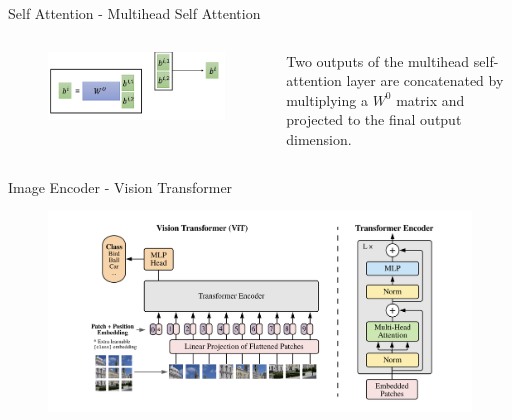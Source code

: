 \documentclass[aspectratio=169,xcolor=dvipsnames]{beamer}
\begin{document}
\begin{frame}{Self Attention - Multihead Self Attention}
    \begin{columns}
        \begin{column}{0.7\textwidth}
            \begin{figure}
            \centering
            \includegraphics[width=0.9\linewidth]{figures/multihead_self_attention_output_concatenation.png}
            \label{multihead_self_attention_output_concatenation}
            \end{figure}
        \end{column}
        \begin{column}{0.3\textwidth}
            Two outputs of the multihead self-attention layer are concatenated by multiplying a $W^0$ matrix and projected to the final output dimension.
        \end{column}
    \end{columns}
\end{frame}





\begin{frame}{Image Encoder - Vision Transformer}
    \begin{figure}
        \centering
        \includegraphics[width=0.9\linewidth]{figures/ViT_architecture.png}
        \label{ViT_architecture}
    \end{figure}
\end{frame}
\end{document}
